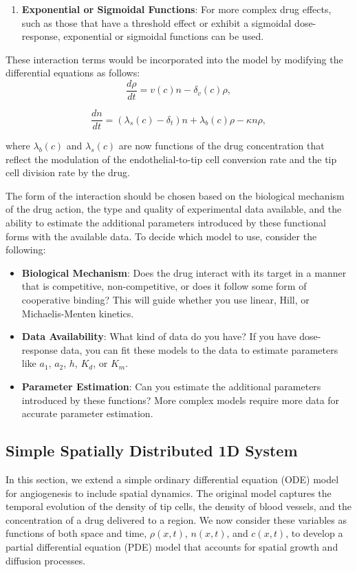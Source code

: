 \begin{enumerate}
	\item \textbf{Exponential or Sigmoidal Functions}: For more complex drug effects, such as those that have a threshold effect or exhibit a sigmoidal dose-response, exponential or sigmoidal functions can be used.
\end{enumerate}

These interaction terms would be incorporated into the model by modifying the differential equations as follows:
\[
\frac{d\rho}{dt} = v(c)n - \delta_v(c) \rho,
\]

\[
\frac{dn}{dt} = (\lambda_s(c) - \delta_t) n + \lambda_b(c) \rho - \kappa n \rho,
\]

where \( \lambda_b(c) \) and \( \lambda_s(c) \) are now functions of the drug concentration that reflect the modulation of the endothelial-to-tip cell conversion rate and the tip cell division rate by the drug.

The form of the interaction should be chosen based on the biological mechanism of the drug action, the type and quality of experimental data available, and the ability to estimate the additional parameters introduced by these functional forms with the available data.
To decide which model to use, consider the following:

\begin{itemize}
	\item \textbf{Biological Mechanism}: Does the drug interact with its target in a manner that is competitive, non-competitive, or does it follow some form of cooperative binding? This will guide whether you use linear, Hill, or Michaelis-Menten kinetics.
	\item \textbf{Data Availability}: What kind of data do you have? If you have dose-response data, you can fit these models to the data to estimate parameters like \( a_1 \), \( a_2 \), \( h \), \( K_d \), or \( K_m \).
	\item \textbf{Parameter Estimation}: Can you estimate the additional parameters introduced by these functions? More complex models require more data for accurate parameter estimation.
\end{itemize}



\subsection{Simple Spatially Distributed 1D System}


In this section, we extend a simple ordinary differential equation (ODE) model for angiogenesis to include spatial dynamics. The original model captures the temporal evolution of the density of tip cells, the density of blood vessels, and the concentration of a drug delivered to a region. We now consider these variables as functions of both space and time, \(\rho(x,t)\), \(n(x,t)\), and \(c(x,t)\), to develop a partial differential equation (PDE) model that accounts for spatial growth and diffusion processes.

